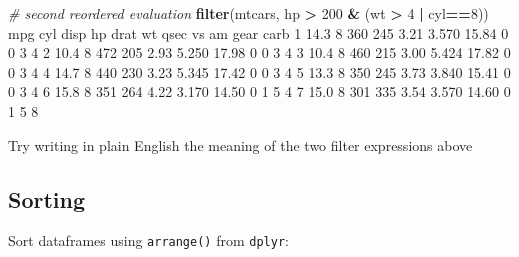 \documentclass[]{article}
\newenvironment{Shaded}{\begin{snugshade}}{\end{snugshade}}
\newcommand{\CommentTok}[1]{\textcolor[rgb]{0.56,0.35,0.01}{\textit{#1}}}
\newcommand{\DecValTok}[1]{\textcolor[rgb]{0.00,0.00,0.81}{#1}}
\newcommand{\FloatTok}[1]{\textcolor[rgb]{0.00,0.00,0.81}{#1}}
\newcommand{\KeywordTok}[1]{\textcolor[rgb]{0.13,0.29,0.53}{\textbf{#1}}}
\newcommand{\NormalTok}[1]{#1}
\newcommand{\OperatorTok}[1]{\textcolor[rgb]{0.81,0.36,0.00}{\textbf{#1}}}
\newcommand{\StringTok}[1]{\textcolor[rgb]{0.31,0.60,0.02}{#1}}
\begin{document}
\begin{Shaded}
\begin{Highlighting}[]
\CommentTok{# second reordered evaluation}
\KeywordTok{filter}\NormalTok{(mtcars, hp }\OperatorTok{>}\StringTok{ }\DecValTok{200} \OperatorTok{&}\StringTok{ }\NormalTok{(wt }\OperatorTok{>}\StringTok{ }\DecValTok{4} \OperatorTok{|}\StringTok{ }\NormalTok{cyl}\OperatorTok{==}\DecValTok{8}\NormalTok{))}
\NormalTok{   mpg cyl disp  hp drat    wt  qsec vs am gear carb}
\DecValTok{1} \FloatTok{14.3}   \DecValTok{8}  \DecValTok{360} \DecValTok{245} \FloatTok{3.21} \FloatTok{3.570} \FloatTok{15.84}  \DecValTok{0}  \DecValTok{0}    \DecValTok{3}    \DecValTok{4}
\DecValTok{2} \FloatTok{10.4}   \DecValTok{8}  \DecValTok{472} \DecValTok{205} \FloatTok{2.93} \FloatTok{5.250} \FloatTok{17.98}  \DecValTok{0}  \DecValTok{0}    \DecValTok{3}    \DecValTok{4}
\DecValTok{3} \FloatTok{10.4}   \DecValTok{8}  \DecValTok{460} \DecValTok{215} \FloatTok{3.00} \FloatTok{5.424} \FloatTok{17.82}  \DecValTok{0}  \DecValTok{0}    \DecValTok{3}    \DecValTok{4}
\DecValTok{4} \FloatTok{14.7}   \DecValTok{8}  \DecValTok{440} \DecValTok{230} \FloatTok{3.23} \FloatTok{5.345} \FloatTok{17.42}  \DecValTok{0}  \DecValTok{0}    \DecValTok{3}    \DecValTok{4}
\DecValTok{5} \FloatTok{13.3}   \DecValTok{8}  \DecValTok{350} \DecValTok{245} \FloatTok{3.73} \FloatTok{3.840} \FloatTok{15.41}  \DecValTok{0}  \DecValTok{0}    \DecValTok{3}    \DecValTok{4}
\DecValTok{6} \FloatTok{15.8}   \DecValTok{8}  \DecValTok{351} \DecValTok{264} \FloatTok{4.22} \FloatTok{3.170} \FloatTok{14.50}  \DecValTok{0}  \DecValTok{1}    \DecValTok{5}    \DecValTok{4}
\DecValTok{7} \FloatTok{15.0}   \DecValTok{8}  \DecValTok{301} \DecValTok{335} \FloatTok{3.54} \FloatTok{3.570} \FloatTok{14.60}  \DecValTok{0}  \DecValTok{1}    \DecValTok{5}    \DecValTok{8}
\end{Highlighting}
\end{Shaded}

Try writing in plain English the meaning of the two filter expressions above

\hypertarget{sorting}{%
\subsection*{Sorting}\label{sorting}}

Sort dataframes using \texttt{arrange()} from \texttt{dplyr}:
\end{document}
